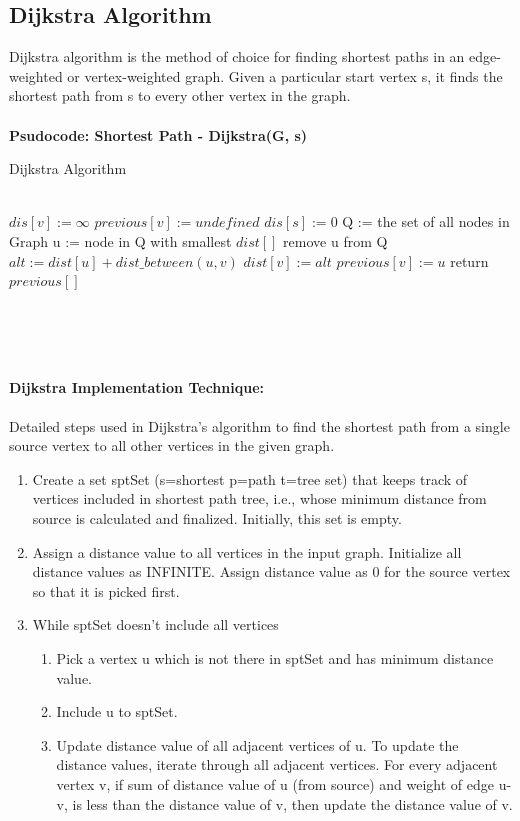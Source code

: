 \documentclass[a4paper,10pt]{article}
\begin{document}
\subsection{Dijkstra Algorithm}
Dijkstra algorithm is the method of choice for finding shortest paths in an edge-weighted or vertex-weighted graph. Given a particular start vertex s, it finds the shortest path from s to every other vertex in the graph.
\\\\
\textbf{Psudocode: Shortest Path - Dijkstra(G, s)~\cite{re4}}
\begin{algorithm}
    \caption{Dijkstra Algorithm}
    \label{dij}
    \begin{algorithmic}[1]
        \\
         \State $dis[v]:=\infty$ \State $previous[v]:=undefined$\EndFor
        \State $dis[s]:=0$ \State Q := the set of all nodes in Graph
         \State u := node in Q with smallest $dist[]$ \State remove u from Q \EndWhile
            \State $alt := dist[u] + dist\_between(u, v)$
             \State $dist[v] := alt$ \State $previous[v] := u$ \EndIf
        \EndFor
        \State  return $previous[ ]$

        \EndProcedure
        \\\\
    \end{algorithmic}
\end{algorithm}
\\
\textbf{Dijkstra Implementation Technique:}\\\\
Detailed steps used in Dijkstra’s algorithm to find the shortest path from a single source vertex to all other vertices in the given graph.
\begin{enumerate}
  \item Create a set sptSet (s=shortest p=path t=tree set) that keeps track of vertices included in shortest path tree, i.e., whose minimum distance from source is calculated and finalized. Initially, this set is empty.
  \item  Assign a distance value to all vertices in the input graph. Initialize all distance values as INFINITE. Assign distance value as 0 for the source vertex so that it is picked first.
  \item While sptSet doesn’t include all vertices
  \begin{enumerate}
    \item Pick a vertex u which is not there in sptSet and has minimum distance value.
    \item Include u to sptSet.
    \item Update distance value of all adjacent vertices of u. To update the distance values, iterate through all adjacent vertices. For every adjacent vertex v, if sum of distance value of u (from source) and weight of edge u-v, is less than the distance value of v, then update the distance value of v.
  \end{enumerate}
\end{enumerate}
\end{document}
